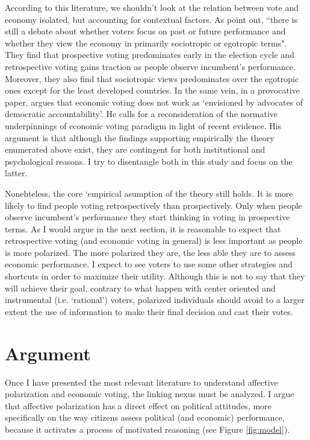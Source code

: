 \documentclass[a4paper, svgnames]{article}
\begin{document}
According to this literature, we shouldn't look at the relation between vote and economy isolated, but accounting for contextual factors. As \cite[p. 1]{Singer2015} point out, ``there is still a debate about whether voters focus on past or future performance and whether they view the economy in primarily sociotropic or egotropic terms". They find that prospective voting predominates early in the election cycle and retrospective voting gains traction as people observe incumbent's performance. Moreover, they also find that sociotropic views predominates over the egotropic ones except for the least developed countries. In the same vein, in a provocative paper, \cite[p. 1]{Anderson2007} argues that economic voting does not work as `envisioned by advocates of democratic accountability'. He  calls for a reconsideration of the normative underpinnings of economic voting paradigm in light of recent evidence. His argument is that although the findings supporting empirically the theory enumerated above exist, they are contingent for both institutional and psychological reasons. I try to disentangle both in this study and focus on the latter.

Nonehteless, the core `empirical asumption of the theory still holds. It is more likely to find people voting retrospectively than prospectively. Only when people observe incumbent's performance they start thinking in voting in prospective terms. As I would argue in the next section, it is reasonable to expect that retrospective voting (and economic voting in general) is less important as people is more polarized. The more polarized they are, the less able they are to assess economic performance. I expect to see voters to use some other strategies and shortcuts in order to maximize their utility. Although this is not to say that they will achieve their goal, contrary to what happen with center oriented and instrumental (i.e. `rational') voters, polarized individuals should avoid to a larger extent the use of information to make their final decision and cast their votes.

\section{Argument}

Once I have presented the most relevant literature to understand affective polarization and economic voting, the linking nexus must be analyzed. I argue that affective polarization has a direct effect on political attitudes, more specifically on the way citizens assess political (and economic) performance, because it activates a process of motivated reasoning (see Figure \ref{fig:model}). 
\end{document}
